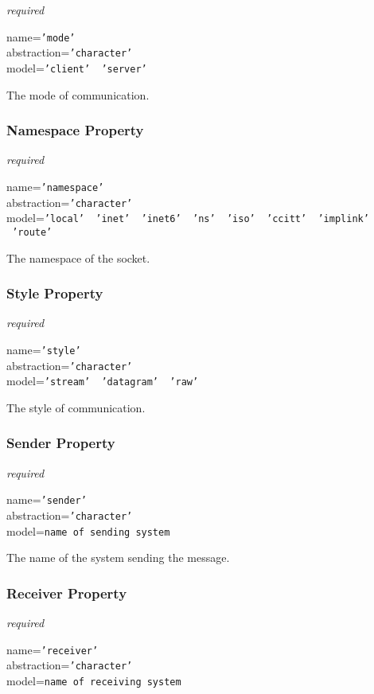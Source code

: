 \emph{required}

name=\texttt{'mode'}\\
abstraction=\texttt{'character'}\\
model=\texttt{'client' \vline\ 'server'}

The mode of communication.

\subsubsection{Namespace Property}

\emph{required}

name=\texttt{'namespace'}\\
abstraction=\texttt{'character'}\\
model=\texttt{'local' \vline\ 'inet' \vline\ 'inet6' \vline\ 'ns' \vline\ 'iso' \vline\ 'ccitt' \vline\ 'implink' \vline\ 'route'}

The namespace of the socket.

\subsubsection{Style Property}

\emph{required}

name=\texttt{'style'}\\
abstraction=\texttt{'character'}\\
model=\texttt{'stream' \vline\ 'datagram' \vline\ 'raw'}

The style of communication.

\subsubsection{Sender Property}

\emph{required}

name=\texttt{'sender'}\\
abstraction=\texttt{'character'}\\
model=\texttt{name of sending system}

The name of the system sending the message.

\subsubsection{Receiver Property}

\emph{required}

name=\texttt{'receiver'}\\
abstraction=\texttt{'character'}\\
model=\texttt{name of receiving system}

